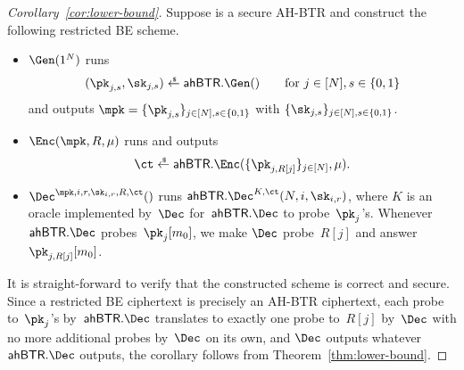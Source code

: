 \begin{proof}
[%
Corollary~\ref{cor:lower-bound}]
Suppose
is a secure AH-BTR and
construct the following restricted BE scheme.
\begin{itemize}
\item $\Gen(1^N)$ runs
\begin{align*}
(\pk_{j,s},\sk_{j,s})\draws\AHBTR.\Gen()\qquad\textup{for }j\in[N],s\in\bit
\end{align*}
and outputs ${\mpk=\{\pk_{j,s}\}_{j\in[N],s\in\bit}}$ with $\{\sk_{j,s}\}_{j\in[N],s\in\bit}$.
\item $\Enc(\mpk,R,\mu)$ runs and outputs
\begin{align*}
\ct\draws\AHBTR.\Enc(\{\pk_{j,R[j]}\}_{j\in[N]},\mu).
\end{align*}
\item $\Dec^{\mpk,i,r,\sk_{i,r},R,\ct}()$
runs $\AHBTR.\Dec^{K,\ct}(N,i,\sk_{i,r})$,
where $K$ is an oracle implemented by~$\Dec$ for~$\AHBTR.\Dec$ to probe~$\pk_j$'s.
Whenever $\AHBTR.\Dec$ probes~$\pk_j[m_0]$,
we make $\Dec$ probe~$R[j]$ and answer~$\pk_{j,R[j]}[m_0]$.
\end{itemize}
It is straight-forward to verify that the constructed scheme is correct and secure.
Since
a restricted BE ciphertext is precisely an AH-BTR ciphertext,
each probe to~$\pk_j$'s by~$\AHBTR.\Dec$ translates to exactly one probe to~$R[j]$ by~$\Dec$ with no more additional probes by~$\Dec$ on its own, and
$\Dec$ outputs whatever $\AHBTR.\Dec$ outputs,
the corollary follows from Theorem~\ref{thm:lower-bound}.
\end{proof}
